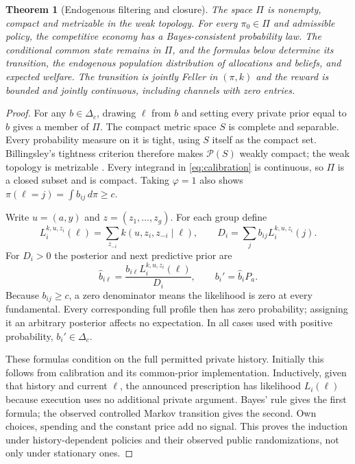 \documentclass[11pt,a4paper]{article}
\newtheorem{theorem}{Theorem}
\newcommand{\cP}{\mathcal P}
\newcommand{\dd}{\,d}
\begin{document}
\begin{theorem}[Endogenous filtering and closure]\label{thm:closure}
The space $\Pi$ is nonempty, compact and metrizable in the weak topology.
For every $\pi_0\in\Pi$ and admissible policy, the competitive economy has
a Bayes-consistent probability law. The conditional common state remains in
$\Pi$, and the formulas below determine its transition, the endogenous
population distribution of allocations and beliefs, and expected welfare.
The transition is jointly Feller in $(\pi,k)$ and the reward is bounded and
jointly continuous, including channels with zero entries.
\end{theorem}
\begin{proof}
For any $b\in\Delta_c$, drawing $\ell$ from $b$ and setting every private
prior equal to $b$ gives a member of $\Pi$. The compact metric space $S$ is
complete and separable. Every probability measure on it is tight, using $S$
itself as the compact set. Billingsley's tightness criterion
\cite[Section 4, Theorem 4.1, p.10]{billingsley} therefore makes $\cP(S)$
weakly compact; the weak topology is metrizable
\cite[Section 2, p.5]{billingsley}. Every integrand in \eqref{eq:calibration} is
continuous, so $\Pi$ is a closed subset and is compact. Taking $\varphi=1$
also shows $\pi(\ell=j)=\int b_{ij}\dd\pi\geq c$.

Write $u=(a,y)$ and $z=(z_1,\ldots,z_g)$. For each group define
\[
 L_i^{k,u,z_i}(\ell)=\sum_{z_{-i}}k(u,z_i,z_{-i}\mid\ell),
 \qquad D_i=\sum_jb_{ij}L_i^{k,u,z_i}(j).
\]
For $D_i>0$ the posterior and next predictive prior are
\begin{equation}\label{eq:filter}
 \widehat b_{i\ell}=\frac{b_{i\ell}L_i^{k,u,z_i}(\ell)}{D_i},
 \qquad b_i'=\widehat b_iP_a.
\end{equation}
Because $b_{ij}\geq c$, a zero denominator means the likelihood is zero at
every fundamental. Every corresponding full profile then has zero probability;
assigning it an arbitrary posterior affects no expectation. In all cases
used with positive probability, $b_i'\in\Delta_c$.

These formulas condition on the full permitted private history. Initially
this follows from calibration and its common-prior implementation. Inductively,
given that history and current $\ell$, the announced prescription has likelihood
$L_i(\ell)$ because execution uses no additional private argument. Bayes' rule
gives the first formula; the observed controlled Markov transition gives the
second. Own choices, spending and the constant price add no signal. This proves
the induction under history-dependent policies and their observed public
randomizations, not only under stationary ones.


\end{proof}
\end{document}
